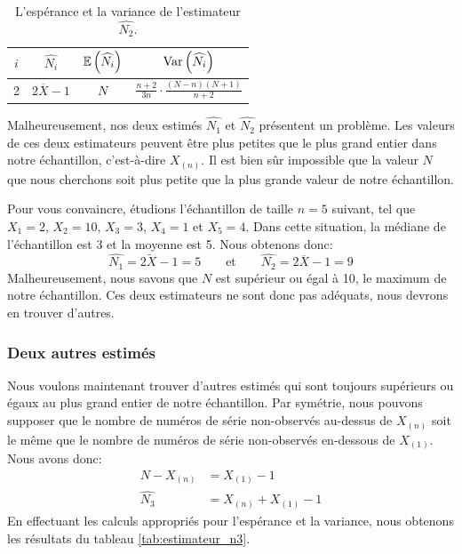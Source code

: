 \documentclass[10pt]{article}
\begin{document}
\begin{table}[ht]
\begin{center}
\begin{tabular}{|c|c|c|c|}
\hline
$i$ & $\widehat{N_i}$ & $\operatorname{\mathbb{E}}\left(\widehat{N_i}\right)$ & $\operatorname{Var}\left(\widehat{N_i}\right)$ \\
\hline
\hline
2 & $2\overline{X}-1$ & $N$ & $\frac{n+2}{3n}\cdot\frac{(N-n)(N+1)}{n+2}$ \\
\hline
\end{tabular}
\end{center}
\caption{\label{tab:estimateur_n2} {L'espérance et la variance de l'estimateur $\widehat{N_2}$.} }
\end{table}

Malheureusement, nos deux estimés \(\widehat{N_1}\) et \(\widehat{N_2}\)
présentent un problème. Les valeurs de ces deux estimateurs peuvent être
plus petites que le plus grand entier dans notre échantillon,
c'est-à-dire \(X_{(n)}\). Il est bien sûr impossible que la valeur \(N\)
que nous cherchons soit plus petite que la plus grande valeur de notre
échantillon.

Pour vous convaincre, étudions l'échantillon de taille \(n=5\) suivant,
tel que \(X_1=2\), \(X_2=10\), \(X_3=3\), \(X_4=1\) et \(X_5=4\). Dans
cette situation, la médiane de l'échantillon est 3 et la moyenne est 5.
Nous obtenons donc:
\[\widehat{N_1}=2\widetilde{X}-1=5 \qquad \text{et} \qquad \widehat{N_2}=2\overline{X}-1=9 \]
Malheureusement, nous savons que \(N\) est supérieur ou égal à 10, le
maximum de notre échantillon. Ces deux estimateurs ne sont donc pas
adéquats, nous devrons en trouver d'autres.

\hypertarget{deux-autres-estimes}{%
\subsubsection{Deux autres estimés}\label{deux-autres-estimes}}

Nous voulons maintenant trouver d'autres estimés qui sont toujours
supérieurs ou égaux au plus grand entier de notre échantillon. Par
symétrie, nous pouvons supposer que le nombre de numéros de série
non-observés au-dessus de \(X_{(n)}\) soit le même que le nombre de
numéros de série non-observés en-dessous de \(X_{(1)}\). Nous avons
donc: \begin{align*}
N-X_{(n)} &= X_{(1)}-1 \\
\widehat{N_3} &= X_{(n)}+X_{(1)}-1
\end{align*} En effectuant les calculs appropriés pour l'espérance et la
variance, nous obtenons les résultats du tableau
\ref{tab:estimateur_n3}.
\end{document}

